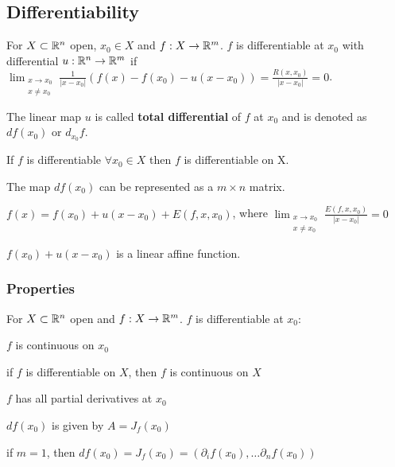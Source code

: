 \subsection{Differentiability}
For $X \subset \mathbb{R}^n$ open, $x_0 \in X$ and $f: X \to \mathbb{R}^m$. $f$ is differentiable at $x_0$ with differential $u: \mathbb{R}^n \to \mathbb{R}^m$ if $\lim_{\substack{x \to x_0\\ x \neq  x_0}} \frac{1}{|x - x_0|}(f(x) - f(x_0) - u(x - x_0)) = \frac{R(x, x_0)}{|x - x_0|} = 0$.
\begin{compactitem}
    \item The linear map $u$ is called \textbf{total differential} of $f$ at $x_0$ and is denoted as $df(x_0)$ or $d_{x_0}f$.
    \item If $f$ is differentiable $\forall x_0 \in X$ then $f$ is differentiable on X.
    \item The map $df(x_0)$ can be represented as a $m \times n$ matrix.
    \item $f(x) = f(x_0) + u(x - x_0) + E(f, x, x_0)$, where $\lim_{\substack{x \to x_0 \\ x \neq x_0}} \frac{E(f, x, x_0)}{|x - x_0|} = 0$
        \begin{compactitem}
            \item $f(x_0) + u(x - x_0)$ is a linear affine function.
        \end{compactitem}
\end{compactitem}

\subsubsection{Properties}
For $X \subset \mathbb{R}^n$ open and $f: X \to \mathbb{R}^m$. $f$ is differentiable at $x_0$:
\begin{compactitem}
    \item $f$ is continuous on $x_0$
        \begin{compactitem}
            \item if $f$ is differentiable on $X$, then $f$ is continuous on $X$
        \end{compactitem}
    \item $f$ has all partial derivatives at $x_0$
    \item $df(x_0)$ is given by $A = J_f(x_0)$
        \begin{compactitem}
            \item if $m = 1$, then $df(x_0) = J_f(x_0) = (\partial_i f(x_0), \dots \partial_n f(x_0))$
        \end{compactitem}
\end{compactitem}


